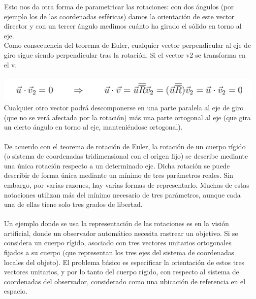 \documentclass[12pt,a4paper]{article}
\begin{document}
Esto nos da otra forma de parametricar las rotaciones: con dos ángulos (por ejemplo los de las coordenadas esféricas) damos la orientación de este vector director y con un tercer ángulo medimos cuánto ha girado el sólido en torno al eje.\\

Como consecuencia del teorema de Euler, cualquier vector perpendicular al eje de giro sigue siendo perpendicular tras la rotación. Si el vector v2 se transforma en el v.\\\\
\includegraphics[scale=1]{Ru5.PNG} \\
Cualquier otro vector podrá descomponerse en una parte paralela al eje de giro (que no se verá afectada por la rotación) más una parte ortogonal al eje (que gira un cierto ángulo en torno al eje, manteniéndose ortogonal).\\\\

De acuerdo con el teorema de rotación de Euler, la rotación de un cuerpo rígido (o sistema de coordenadas tridimensional con el origen fijo) se describe mediante una única rotación respecto a un determinado eje. Dicha rotación se puede describir de forma única mediante un mínimo de tres parámetros reales. Sin embargo, por varias razones, hay varias formas de representarlo. Muchas de estas notaciones utilizan más del mínimo necesario de tres parámetros, aunque cada una de ellas tiene solo tres grados de libertad.\\\\
Un ejemplo donde se usa la representación de las rotaciones es en la visión artificial, donde un observador automático necesita rastrear un objetivo. Si se considera un cuerpo rígido, asociado con tres vectores unitarios ortogonales fijados a su cuerpo (que representan los tres ejes del sistema de coordenadas locales del objeto). El problema básico es especificar la orientación de estos tres vectores unitarios, y por lo tanto del cuerpo rígido, con respecto al sistema de coordenadas del observador, considerado como una ubicación de referencia en el espacio.\\\\
\end{document}
